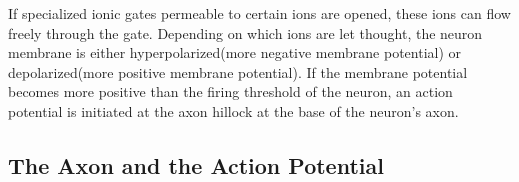 		If specialized ionic gates permeable to certain ions are opened, these ions can flow freely through the gate.
		Depending on which ions are let thought, the neuron membrane is either hyperpolarized(more negative membrane potential) or depolarized(more positive membrane potential).
		If the membrane potential becomes more positive than the firing threshold of the neuron, an action potential is initiated at the axon hillock at the base of the neuron's axon. 
		\cite{PrinciplesOfNeuralScience4edKAP07}









	\subsection{The Axon and the Action Potential}

